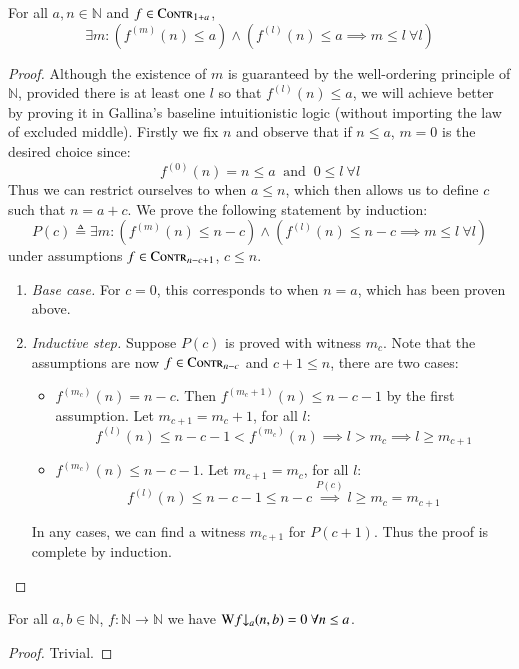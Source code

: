 \begin{lem} \label{lem: contract-repeat-threshold}
For all $a, n\in\mathbb{N}$ and $f\in \text{\scshape{Contr}}_{1+a}$,
\begin{equation}
\exists m : \left(f^{(m)}(n) \le a \right) \wedge \left(f^{(l)}(n)\le a \implies m \le l \ \forall l \right)
\end{equation}
\end{lem}
\begin{proof}
Although the existence of $m$ is guaranteed by the well-ordering principle of $\mathbb{N}$, provided there is at least one $l$ so that $f^{(l)}(n)\le a$, we will achieve better by proving it in Gallina's baseline intuitionistic logic (without importing the law of excluded middle). Firstly we fix $n$ and observe that if $n\le a$, $m = 0$ is the desired choice since:
$$ f^{(0)}(n) = n \le a \ \text{ and } \ 0 \le l \ \forall l $$
Thus we can restrict ourselves to when $a\le n$, which then allows us to define $c$ such that $n = a + c$. We prove the following statement by induction:
$$ P(c) \triangleq \exists m : \left(f^{(m)}(n) \le n - c \right) \wedge \left(f^{(l)}(n)\le n - c \implies m \le l \ \forall l \right) $$
under assumptions $f\in \text{\scshape{Contr}}_{n-c+1}$, $c\le n$.
\begin{enumerate}[leftmargin=*]
	\item \textit{Base case.} For $c = 0$, this corresponds to when $n = a$, which has been proven above.
	\item \textit{Inductive step.} Suppose $P(c)$ is proved with witness $m_c$. Note that the assumptions are now $f\in \text{\scshape{Contr}}_{n-c}$ and $c+1\le n$, there are two cases:
	\begin{itemize}[leftmargin=*, label={-}]
		\item $f^{\left(m_c\right)}(n) = n - c$. Then $f^{\left(m_c+1\right)}(n) \le n - c - 1$ by the first assumption. Let $m_{c+1} = m_c + 1$, for all $l$:
		$$ f^{(l)}(n)\le n - c - 1 < f^{\left(m_c\right)}(n) \implies l > m_c \implies l \ge m_{c+1} $$
		\item $f^{\left(m_c\right)}(n) \le n - c - 1$. Let $m_{c+1} = m_c$, for all $l$:
		$$ f^{(l)}(n)\le n - c - 1\le n - c \overset{P(c)}{\implies} l\ge m_{c} = m_{c+1} $$
	\end{itemize}
	In any cases, we can find a witness $m_{c+1}$ for $P(c+1)$. Thus the proof is complete by induction.
\end{enumerate}
\end{proof}


\begin{lem} \label{lem: cdt-init}
For all $a, b\in \mathbb{N}$, $f : \mathbb{N}\to \mathbb{N}$ we have $\W\cdt{f}{a} (n, b) = 0 \ \forall n\le a$.
\end{lem}
\begin{proof}
Trivial.
\end{proof}

